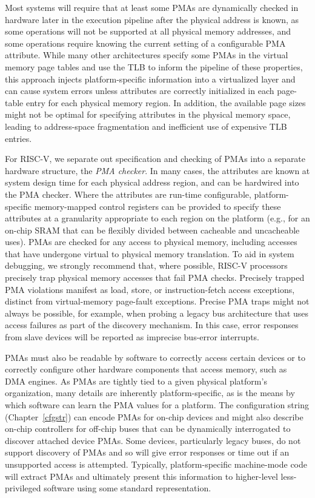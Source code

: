 Most systems will require that at least some PMAs are dynamically
checked in hardware later in the execution pipeline after the physical
address is known, as some operations will not be supported at all
physical memory addresses, and some operations require knowing the
current setting of a configurable PMA attribute.  While many other architectures
specify some PMAs in the virtual memory page tables and use the TLB to
inform the pipeline of these properties, this approach injects platform-specific
information into a virtualized layer and can cause system errors
unless attributes are correctly initialized in each page-table entry
for each physical memory region.  In addition, the available
page sizes might not be optimal for specifying attributes in the
physical memory space, leading to address-space fragmentation and
inefficient use of expensive TLB entries.

For RISC-V, we separate out specification and checking of PMAs into a
separate hardware structure, the {\em PMA checker}.  In many cases,
the attributes are known at system design time for each physical
address region, and can be hardwired into the PMA checker.  Where the
attributes are run-time configurable, platform-specific memory-mapped
control registers can be provided to specify these attributes at a
granularity appropriate to each region on the platform (e.g., for an
on-chip SRAM that can be flexibly divided between cacheable and
uncacheable uses).  PMAs are checked for any access to physical
memory, including accesses that have undergone virtual to physical
memory translation.  To aid in system debugging, we strongly recommend
that, where possible, RISC-V processors precisely trap physical memory
accesses that fail PMA checks.  Precisely trapped PMA violations manifest
as load, store, or instruction-fetch access exceptions, distinct from
virtual-memory page-fault exceptions. Precise PMA traps might not always be
possible, for example, when probing a legacy bus architecture that
uses access failures as part of the discovery mechanism.  In this
case, error responses from slave devices will be reported as imprecise
bus-error interrupts.

PMAs must also be readable by software to correctly access certain
devices or to correctly configure other hardware components that
access memory, such as DMA engines.  As PMAs are tightly tied to a
given physical platform's organization, many details are inherently
platform-specific, as is the means by which software can learn the PMA
values for a platform.  The configuration string
(Chapter~\ref{cfgstr}) can encode PMAs for on-chip devices and might
also describe on-chip controllers for off-chip buses that can be
dynamically interrogated to discover attached device PMAs.  Some
devices, particularly legacy buses, do not support discovery of PMAs
and so will give error responses or time out if an unsupported access
is attempted.  Typically, platform-specific machine-mode code will
extract PMAs and ultimately present this information to higher-level
less-privileged software using some standard representation.


